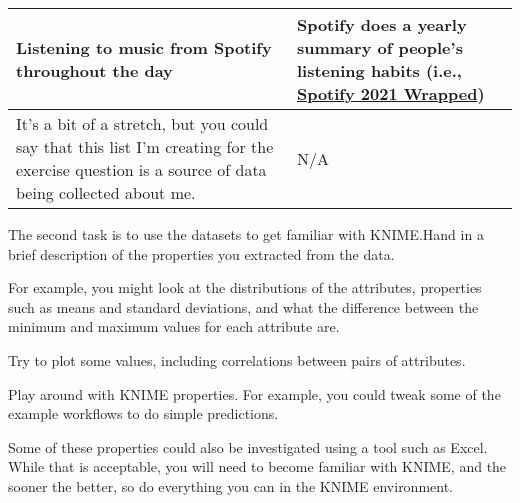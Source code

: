 \documentclass[
  coursecode={CISC/CMPE 251},
  assignmentname={Exercise 1},
  studentnumber=20053722,
  name={Bryan Hoang}
]{
  ltxanswer%
}
\begin{document}
\begin{questions}
\begin{solution}
\begin{center}
\begin{tabularx}{\textwidth}{
            >{\raggedright\arraybackslash}X
            >{\raggedright\arraybackslash}X}
          \midrule
          Listening to music from Spotify throughout the day                                                                                              & Spotify does a yearly summary of people's listening habits (i.e., \href{https://www.spotify.com/ca-en/wrapped/}{Spotify 2021 Wrapped})                                                                                                                                                                                                                                                \\
          \midrule
          It's a bit of a stretch, but you could say that this list I'm creating  for the exercise question is a source of data being collected about me. & N/A                                                                                                                                                                                                                                                                                                                                                                                   \\
          \bottomrule
        \end{tabularx}
      \end{center}
    \end{solution}

    \question[2]{}
    The second task is to use the datasets to get familiar with KNIME.\@ Hand in a brief description of the properties you extracted from the data.

    For example, you might look at the distributions of the attributes, properties such as means and standard deviations, and what the difference between the minimum and maximum values for each attribute are.

    Try to plot some values, including correlations between pairs of attributes.

    Play around with KNIME properties. For example, you could tweak some of the example workflows to do simple predictions.

    Some of these properties could also be investigated using a tool such as Excel. While that is acceptable, you will need to become familiar with KNIME, and the sooner the better, so do everything you can in the KNIME environment.


\end{questions}
\end{document}
